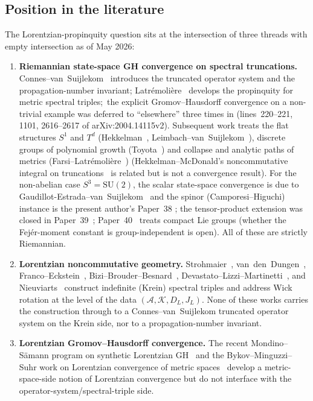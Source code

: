 \documentclass[11pt,a4paper]{article}
\theoremstyle{plain}
\theoremstyle{definition}
\newcommand{\sthree}{S^{3}}
\newcommand{\Krein}{\mathcal{K}}
\newcommand{\Acal}{\mathcal{A}}
\newcommand{\SU}{\mathrm{SU}}
\newcommand{\DL}{D_L}
\newcommand{\JL}{J_L}
\begin{document}
\subsection{Position in the literature}

The Lorentzian-propinquity question
sits at the intersection of three threads with empty intersection as
of May 2026:\
\begin{enumerate}\setlength{\itemsep}{2pt}
\item[(a)] \textbf{Riemannian state-space GH convergence on spectral
truncations.} Connes--van~Suijlekom~\cite{connes_vs2021} introduces
the truncated operator system and the propagation-number invariant;
Latr\'emoli\`ere~\cite{latremoliere_metric_st_2017,latremoliere2018}
develops the propinquity for metric spectral triples;\ the
explicit Gromov--Hausdorff convergence on a non-trivial example was
deferred to ``elsewhere'' three times in \cite{connes_vs2021}
(lines~220--221, 1101, 2616--2617 of arXiv:2004.14115v2). Subsequent
work treats the flat structures $S^1$ and $T^d$
(Hekkelman~\cite{hekkelman2022},
Leimbach--van~Suijlekom~\cite{leimbach_vs2024}), discrete groups of
polynomial growth (Toyota~\cite{toyota2023}) and collapse and analytic
paths of metrics (Farsi--Latr\'emoli\`ere~\cite{farsi_latremoliere2024,
farsi_latremoliere2025}) (Hekkelman--McDonald's noncommutative
integral on truncations~\cite{hekkelman_mcdonald2024b} is related but is
not a convergence result). For the non-abelian case
$\sthree = \SU(2)$, the scalar state-space convergence is due to
Gaudillot-Estrada--van~Suijlekom~\cite{gaudillot_vs2025} and the spinor (Camporesi--Higuchi)
instance is the present author's Paper~38 \cite{paper38}; the tensor-product extension was closed in
Paper~39~\cite{paper39}; Paper~40~\cite{paper40_unified} treats compact
Lie groups (whether the Fej\'er-moment constant is group-independent is
open). All of these
are strictly Riemannian.
\item[(b)] \textbf{Lorentzian noncommutative geometry.}
Strohmaier~\cite{strohmaier2006},
van~den~Dungen~\cite{vandungen2016},
Franco--Eckstein~\cite{franco_eckstein2014},
Bizi--Brouder--Besnard~\cite{bizi_brouder_besnard2018},
Devastato--Lizzi--Martinetti~\cite{devastato_lizzi_martinetti2018},
and
Nieuviarts~\cite{nieuviarts2025a} construct indefinite (Krein)
spectral triples and address Wick rotation at the level of the data
$(\Acal, \Krein, \DL, \JL)$. None of these works carries the
construction through to a Connes--van~Suijlekom truncated operator
system on the Krein side, nor to a propagation-number invariant.
\item[(c)] \textbf{Lorentzian Gromov--Hausdorff convergence.} The
recent Mondino--Sämann program on synthetic Lorentzian
GH~\cite{mondino_samann2025} and the
Bykov--Minguzzi--Suhr work on Lorentzian convergence of metric
spaces~\cite{bykov_minguzzi_suhr2024} develop a metric-space-side
notion of Lorentzian convergence but do not interface with the
operator-system/spectral-triple side.
\end{enumerate}
\end{document}

